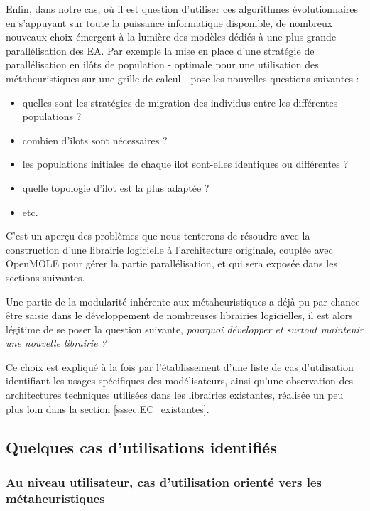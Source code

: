 Enfin, dans notre cas, où il est question d'utiliser ces algorithmes évolutionnaires en s'appuyant sur toute la puissance informatique disponible, de nombreux nouveaux choix \autocite[221-224]{DeJong2006a} émergent à la lumière des modèles dédiés à une plus grande parallélisation des EA. Par exemple la mise en place d'une stratégie de parallélisation en ilôts de population - optimale pour une utilisation des métaheuristiques sur une grille de calcul - pose les nouvelles questions suivantes :

\begin{itemize}
	\item quelles sont les stratégies de migration des individus entre les différentes populations ?
	\item combien d'ilots sont nécessaires ?
	\item les populations initiales de chaque ilot sont-elles identiques ou différentes ?
	\item quelle topologie d'ilot est la plus adaptée ?
	\item etc.
\end{itemize}

C'est un aperçu des problèmes que nous tenterons de résoudre avec la construction d'une librairie logicielle à l'architecture originale, couplée avec OpenMOLE pour gérer la partie parallélisation, et qui sera exposée dans les sections suivantes.

Une partie de la modularité inhérente aux métaheuristiques a déjà pu par chance être saisie dans le développement de nombreuses librairies logicielles, il est alors légitime de se poser la question suivante, \textit{pourquoi développer et surtout maintenir une nouvelle librairie ? }

Ce choix est expliqué à la fois par l'établissement d'une liste de cas d'utilisation identifiant les usages spécifiques des modélisateurs, ainsi qu'une observation des architectures techniques utilisées dans les librairies existantes, réalisée un peu plus loin dans la section \ref{sssec:EC_existantes}.

\subsection{Quelques cas d'utilisations identifiés}
\label{ssec:casUtilisation}

\subsubsection{Au niveau utilisateur, cas d'utilisation orienté vers les métaheuristiques}

